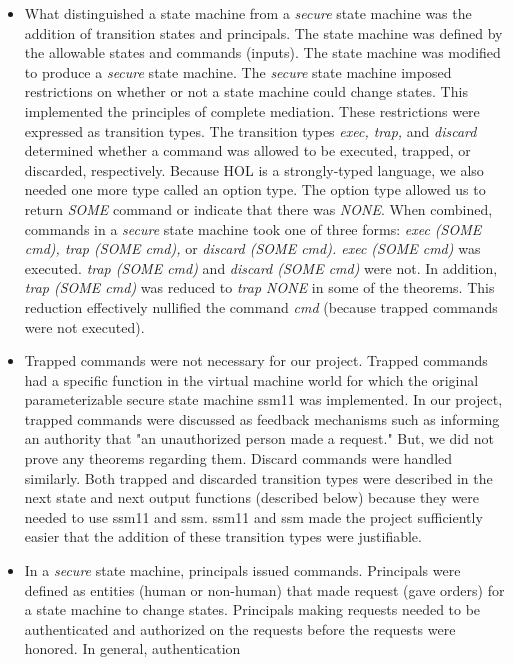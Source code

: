 \begin{itemize}
\item What distinguished a state machine from a \textit{secure} state machine was the
  addition of transition states and principals.  The state machine was defined
  by the allowable states and commands (inputs).  The state machine was modified
  to produce a \textit{secure} state machine.  The \textit{secure} state machine imposed restrictions
  on whether or not a state machine could change states.  This implemented the
  principles of complete mediation.  These restrictions were expressed as transition
  types.  The transition types \textit{exec, trap,} and \textit{discard} determined whether a command
  was allowed to be executed, trapped, or discarded, respectively.  Because HOL
  is a strongly-typed language, we also needed one more type called an option type.
  The option type allowed us to return \textit{SOME} command or indicate that there was \textit{NONE}.
  When combined, commands in a \textit{secure} state machine took one of three forms: \textit{exec
  (SOME cmd), trap (SOME cmd),} or \textit{discard (SOME cmd).  exec (SOME cmd)} was executed.
  \textit{trap (SOME cmd)} and \textit{discard (SOME cmd)} were not.  In addition, \textit{trap (SOME cmd)} was
  reduced to \textit{trap NONE} in some of the theorems.  This reduction effectively nullified
  the command \textit{cmd} (because trapped commands were not executed).
\item Trapped commands were not necessary for our project.  Trapped commands
  had a specific function in the virtual machine world for which the original
  parameterizable secure state machine ssm11 was implemented.  In our project,
  trapped commands were discussed as feedback mechanisms such as informing an
  authority that "an unauthorized person made a request."  But, we did not prove
  any theorems regarding them.  Discard commands were handled similarly.  Both
  trapped and discarded transition types were described in the next state and
  next output functions (described below) because they were needed to use ssm11
  and ssm.  ssm11 and ssm made the project sufficiently easier that the addition
  of these transition types were justifiable.
\item In a \textit{secure} state machine, principals issued commands.  Principals were
  defined as entities (human or non-human) that made request (gave orders) for a state
  machine to change states.  Principals making requests needed to be authenticated and
  authorized on the requests before the requests were honored.  In general, authentication

\end{itemize}
